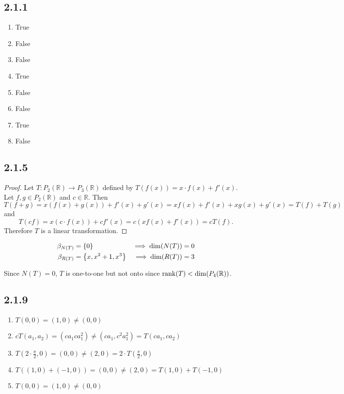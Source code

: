 \documentclass[12pt,titlepage]{extarticle}
\begin{document}
\subsection*{2.1.1}
\begin{enumerate}
    \item True
    \item False
    \item False
    \item True
    \item False
    \item False
    \item True
    \item False
\end{enumerate}

\subsection*{2.1.5}
\begin{proof}
    Let $T : P_2 (\mathbb{R}) \to P_3 (\mathbb{R})$ defined by $T(f(x)) = x \cdot f(x) + f'(x)$. Let $f,g \in P_2 (\mathbb{R})$ and $c \in \mathbb{R}$. Then
    \[
        T(f + g) = x (f(x) + g(x)) + f'(x) + g'(x) = x f(x) + f'(x) + x g(x) + g'(x) = T(f) + T(g)
    \]
    and
    \[
        T(cf) = x (c\cdot f(x)) + c f'(x) = c (x f(x) + f'(x)) = c T(f).
    \]
    Therefore $T$ is a linear transformation.
\end{proof}
\begin{align*}
    \beta_{N(T)} &= \qty{ 0 } &\implies \dim(N(T)) = 0 \\
    \beta_{R(T)} &= \qty{ x, x^2 + 1, x^3 } &\implies \dim(R(T)) = 3
\end{align*}

Since $N(T) = \qty{0}$, $T$ is one-to-one but not onto since $\rank(T) < \dim(P_4(\mathbb{R}))$.

\subsection*{2.1.9}
\begin{enumerate}
    \item $T(0,0) = (1,0) \neq (0,0)$
    \item $cT(a_1, a_2) = (ca_1 ca_1^2) \neq (ca_1, c^2 a_1^2) = T(ca_1, ca_2)$
    \item $T(2\cdot \frac{\pi}{2}, 0) = (0,0) \neq (2,0) = 2\cdot T(\frac{\pi}{2},0)$
    \item $T((1,0) + (-1,0)) = (0,0) \neq (2,0) = T(1,0) + T(-1,0)$
    \item $T(0,0) = (1, 0) \neq (0,0)$
\end{enumerate}
\end{document}
